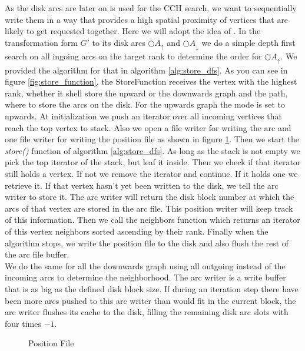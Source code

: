As the disk arcs are later on is used for the CCH search, we want to sequentially write them in a way that provides a high spatial proximity of vertices that are likely to get requested together.
Here we will adopt the idea of \cite[Mobile Route Planning]{Sanders}.
In the transformation form $G'$ to its disk arcs $\bigcirc A_\uparrow$ and $\bigcirc A_\downarrow$ we do a simple depth first search on all ingoing arcs on the target rank to determine the order for $\bigcirc A_\uparrow$.
We provided the algorithm for that in algorithm \ref{alg:store_dfs}.
As you can see in figure \ref{fig:store_function}, the StoreFunction receives the vertex with the highest rank, whether it shell store the upward or the downwards graph and the path, where to store the arcs on the disk.
For the upwards graph the mode is set to upwards.
At initialization we push an iterator over all incoming vertices that reach the top vertex to stack.
Also we open a file writer for writing the arc and one file writer for writing the position file as shown in figure \ref{fig:position_file}.
Then we start the \textit{store()} function of algorithm \ref{alg:store_dfs}.
As long as the stack is not empty we pick the top iterator of the stack, but leaf it inside.
Then we check if that iterator still holds a vertex.
If not we remove the iterator and continue.
If it holds one we retrieve it.
If that vertex hasn't yet been written to the disk, we tell the arc writer to store it.
The arc writer will return the disk block number at which the arcs of that vertex are stored in the arc file.
This position writer will keep track of this information.
Then we call the neighbors function which returns an iterator of this vertex neighbors sorted ascending by their rank.
Finally when the algorithm stops, we write the position file to the disk and also flush the rest of the arc file buffer.
\\
We do the same for all the downwards graph using all outgoing instead of the incoming arcs to determine the neighborhood.
The arc writer is a write buffer that is as big as the defined disk block size.
If during an iteration step there have been more arcs pushed to this arc writer than would fit in the current block, the arc writer flushes its cache to the disk, filling the remaining disk arc slots with four times $-1$.

\begin{figure}
    \centering
    
    \caption{Position File}
    \label{fig:position_file}
\end{figure}


